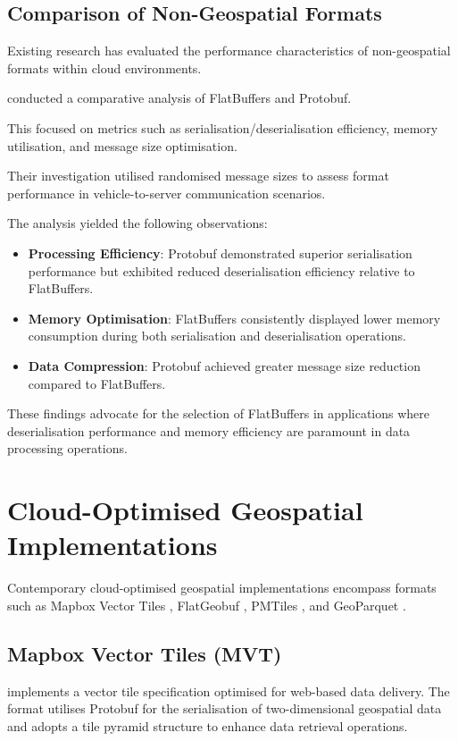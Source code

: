 \subsection{Comparison of Non-Geospatial Formats}
\label{rw:non_geospatial_formats:comparison}

Existing research has evaluated the performance characteristics of non-geospatial formats within cloud environments.

\citet{daniel_persson_2020} conducted a comparative analysis of FlatBuffers and Protobuf.

This focused on metrics such as serialisation/deserialisation efficiency, memory utilisation, and message size optimisation.

Their investigation utilised randomised message sizes to assess format performance in vehicle-to-server communication scenarios.

The analysis yielded the following observations:

\begin{itemize}
  \item \textbf{Processing Efficiency}: Protobuf demonstrated superior serialisation performance but exhibited reduced deserialisation efficiency relative to FlatBuffers.
  \item \textbf{Memory Optimisation}: FlatBuffers consistently displayed lower memory consumption during both serialisation and deserialisation operations.
  \item \textbf{Data Compression}: Protobuf achieved greater message size reduction compared to FlatBuffers.
\end{itemize}

These findings advocate for the selection of FlatBuffers in applications where deserialisation performance and memory efficiency are paramount in data processing operations.

\section{Cloud-Optimised Geospatial Implementations}
\label{rw:cloud_optimised_implementations}
Contemporary cloud-optimised geospatial implementations encompass formats such as Mapbox Vector Tiles \citep{mapbox-vector-tiles}, FlatGeobuf \citep{flatgeobuf}, PMTiles \citep{pmtiles}, and GeoParquet \citep{geoparquet}.

\subsection{Mapbox Vector Tiles (MVT)}
\label{rw:cloud_optimised_implementations:mvt}
\citet{mapbox-vector-tiles} implements a vector tile specification optimised for web-based data delivery. The format utilises Protobuf for the serialisation of two-dimensional geospatial data and adopts a tile pyramid structure to enhance data retrieval operations.

